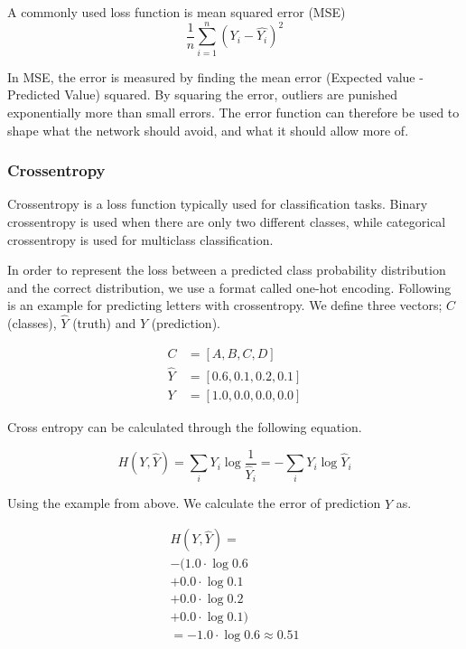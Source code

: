 A commonly used loss function is mean squared error (MSE)
\begin{equation}
    \frac{1}{n} \sum^n_{i=1} (Y_i - \hat{Y_i})^2
\end{equation}

In MSE, the error is measured by finding the mean error (Expected value - Predicted Value) squared. By squaring the error, outliers are punished exponentially more than small errors. The error function can therefore be used to shape what the network should avoid, and what it should allow more of.%

\subsubsection{Crossentropy}
\label{categorical-crossentropy}

Crossentropy is a loss function typically used for classification tasks. Binary crossentropy is used when there are only two different classes, while categorical crossentropy is used for multiclass classification.

In order to represent the loss between a predicted class probability distribution and the correct distribution, we use a format called one-hot encoding. Following is an example for predicting letters with crossentropy. We define three vectors; $C$ (classes), $\hat{Y}$ (truth) and $Y$ (prediction).



\begin{equation} \label{eqn:catcross_ex1}
\begin{split}
    C &= [A, B, C, D] \\
    \hat{Y} &= [0.6, 0.1, 0.2, 0.1] \\
    Y &= [1.0, 0.0, 0.0, 0.0]
\end{split}
\end{equation}

Cross entropy can be calculated through the following equation.

\begin{equation} \label{eqn:catcross_ex2}
    H(Y, \hat{Y}) = \sum_i Y_i \log \frac{1}{\hat{Y}_i} = -\sum_i Y_i \log \hat{Y}_i
\end{equation}

Using the example from above. We calculate the error of prediction $\hat{Y}$ as.

\begin{equation} \label{eqn:catcross_ex3}
\begin{split}
    H(Y, \hat{Y}) = \\
    -( 1.0 \cdot \log 0.6\\
    + 0.0 \cdot \log 0.1\\
    + 0.0 \cdot \log 0.2\\
    + 0.0 \cdot \log 0.1) \\
    = - 1.0 \cdot \log 0.6 \approx 0.51
\end{split}
\end{equation}

